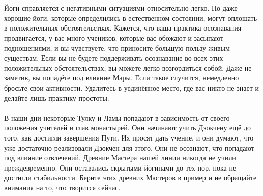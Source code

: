 \newpage
\\ \\ Йоги справляется с негативными ситуациями относительно легко. Но даже хорошие йоги, которые определились в естественном состоянии, могут оплошать в положительных обстоятельствах. Кажется, что ваша практика осознавания продвигается, у вас много учеников, которые вас обожают и засыпают подношениями, и вы чувствуете, что приносите большую пользу живым существам. Если вы не будете поддерживать осознавание во всех этих положительных обстоятельствах, вы можете легко возгордиться собой. Даже не заметив, вы попадёте под влияние Мары. Если такое случится, немедленно бросьте свои активности. Удалитесь в уединённое место, где вас никто не знает и делайте лишь практику простоты.
\\ \\ В наши дни некоторые Тулку и Ламы попадают в зависимость от своего положения учителей и глав монастырей. Они начинают учить Дзокчену ещё до того, как достигли завершения Пути. Их просят дать учение, и они думают, что уже достаточно реализовали Дзокчен для этого. Они не осознают, что попадают под влияние отвлечений. Древние Мастера нашей линии никогда не учили преждевременно. Они оставались скрытыми йогинами до тех пор, пока не достигли стабильности. Берите этих древних Мастеров в пример и не обращайте внимания на то, что творится сейчас.
